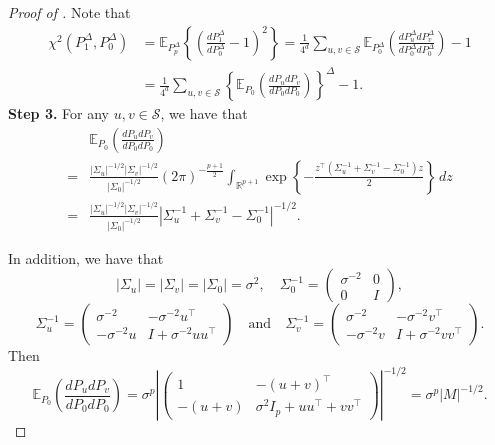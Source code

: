\documentclass[twoside]{article}
\begin{document}
\begin{proof}[Proof of ]
Note that
	\begin{align*}
		\chi^2(P_1^{\Delta}, P_0^{\Delta}) & = \mathbb{E}_{P_p^{\Delta}}\left\{\left(\frac{dP_1^{\Delta}}{dP_0^{\Delta}} - 1\right)^2\right\} = \frac{1}{4^d} \sum_{u, v \in \mathcal{S}} \mathbb{E}_{P_0^{\Delta}} \left(\frac{dP^{\Delta}_u dP^{\Delta}_v}{dP^{\Delta}_0 dP^{\Delta}_0}\right) - 1 \\
		& = \frac{1}{4^d} \sum_{u, v \in \mathcal{S}} \left\{\mathbb{E}_{P_0} \left(\frac{dP_u dP_v}{dP_0 dP_0}\right)\right\}^{\Delta} - 1.
	\end{align*}
\medskip
\noindent \textbf{Step 3.}  For any $u, v \in \mathcal{S}$, we have that
	\begin{align*}
		& \mathbb{E}_{P_0} \left(\frac{dP_u dP_v}{dP_0 dP_0}\right) \\
		= & \frac{|\Sigma_u|^{-1/2} |\Sigma_v|^{-1/2}}{|\Sigma_0|^{-1/2}} (2\pi)^{-\frac{p+1}{2}} \int_{\mathbb{R}^{p+1}} \exp \left\{-\frac{z^{\top}(\Sigma_u^{-1} + \Sigma_v^{-1} - \Sigma_0^{-1})z}{2}\right\}\, dz \\
		= & \frac{|\Sigma_u|^{-1/2} |\Sigma_v|^{-1/2}}{|\Sigma_0|^{-1/2}} |\Sigma_u^{-1} + \Sigma_v^{-1} - \Sigma_0^{-1}|^{-1/2}.
	\end{align*}
	
In addition, we have that
	\[
		|\Sigma_u| = |\Sigma_v| = |\Sigma_0| = \sigma^2, \quad \Sigma^{-1}_0 = \left(\begin{array}{cc} 
			\sigma^{-2} & 0 \\
			0 & I 
		\end{array}\right),
	\]	
	\[
		\Sigma^{-1}_u = \left(\begin{array}{cc} 
			\sigma^{-2} & -\sigma^{-2}u^{\top} \\
			-\sigma^{-2} u & I + \sigma^{-2}u u^{\top}
		\end{array}\right) \quad \mbox{and}  \quad \Sigma^{-1}_v = \left(\begin{array}{cc} 
			\sigma^{-2} & -\sigma^{-2}v^{\top} \\
			-\sigma^{-2} v & I + \sigma^{-2} v v^{\top}
		\end{array}\right).
	\]
	Then
	\[
		\mathbb{E}_{P_0} \left(\frac{dP_u dP_v}{dP_0 dP_0}\right) = \sigma^p \left|\left(\begin{array}{cc}
			1 & -(u+v)^{\top} \\
			-(u+v) & \sigma^2 I_p + uu^{\top} + vv^{\top}				
		\end{array}\right)\right|^{-1/2} = \sigma^p |M|^{-1/2}.
	\]
	

\end{proof}
\end{document}
